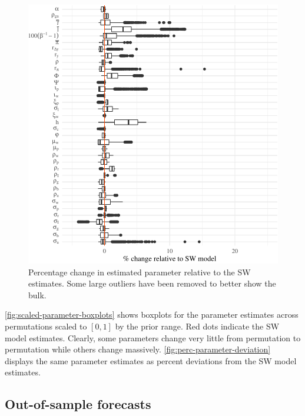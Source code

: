 \documentclass[11pt]{article}
\begin{document}
\begin{figure}[t]

{\centering \includegraphics{gfx/perc-parameter-deviation-1} 

}

\caption{Percentage change in estimated parameter relative to the SW estimates. Some large outliers have been removed to better show the bulk.}\label{fig:perc-parameter-deviation}
\end{figure}

\autoref{fig:scaled-parameter-boxplots} shows boxplots for the parameter
estimates across permutations scaled to \([0,1]\) by the prior range.
Red dots indicate the SW model estimates. Clearly, some parameters
change very little from permutation to permutation while others change
massively. \autoref{fig:perc-parameter-deviation} displays the same
parameter estimates as percent deviations from the SW model estimates.

\hypertarget{out-of-sample-forecasts}{%
\subsection{Out-of-sample forecasts}\label{out-of-sample-forecasts}}
\end{document}

